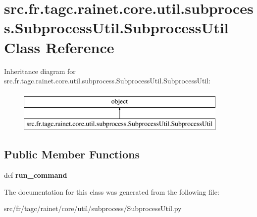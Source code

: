 \hypertarget{classsrc_1_1fr_1_1tagc_1_1rainet_1_1core_1_1util_1_1subprocess_1_1SubprocessUtil_1_1SubprocessUtil}{\section{src.\-fr.\-tagc.\-rainet.\-core.\-util.\-subprocess.\-Subprocess\-Util.\-Subprocess\-Util Class Reference}
\label{classsrc_1_1fr_1_1tagc_1_1rainet_1_1core_1_1util_1_1subprocess_1_1SubprocessUtil_1_1SubprocessUtil}
}
Inheritance diagram for src.\-fr.\-tagc.\-rainet.\-core.\-util.\-subprocess.\-Subprocess\-Util.\-Subprocess\-Util\-:\begin{figure}[H]
\begin{center}
\leavevmode
\includegraphics[height=2.000000cm]{classsrc_1_1fr_1_1tagc_1_1rainet_1_1core_1_1util_1_1subprocess_1_1SubprocessUtil_1_1SubprocessUtil}
\end{center}
\end{figure}
\subsection*{Public Member Functions}
\begin{DoxyCompactItemize}
\item 
\hypertarget{classsrc_1_1fr_1_1tagc_1_1rainet_1_1core_1_1util_1_1subprocess_1_1SubprocessUtil_1_1SubprocessUtil_abbeb00a3268bdd99e50f0de2209e0fae}{def {\bfseries run\-\_\-command}}\label{classsrc_1_1fr_1_1tagc_1_1rainet_1_1core_1_1util_1_1subprocess_1_1SubprocessUtil_1_1SubprocessUtil_abbeb00a3268bdd99e50f0de2209e0fae}

\end{DoxyCompactItemize}


The documentation for this class was generated from the following file\-:\begin{DoxyCompactItemize}
\item 
src/fr/tagc/rainet/core/util/subprocess/Subprocess\-Util.\-py\end{DoxyCompactItemize}
